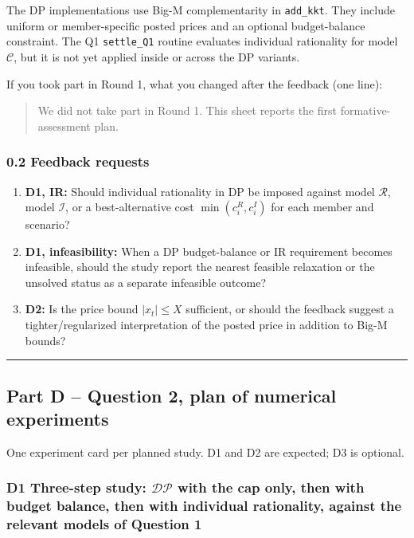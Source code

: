 \documentclass[]{article}
\providecommand{\tightlist}{\setlength{\itemsep}{0pt}\setlength{\parskip}{0pt}}
\begin{document}
The DP implementations use Big-M complementarity in \texttt{add\_kkt}.
They include uniform or member-specific posted prices and an optional
budget-balance constraint. The Q1 \texttt{settle\_Q1} routine evaluates
individual rationality for model \(\mathcal C\), but it is not yet applied
inside or across the DP variants.

If you took part in Round 1, what you changed after the feedback (one line):

\begin{quote}
We did not take part in Round 1. This sheet reports the first formative-assessment plan.
\end{quote}

\subsubsection{0.2 Feedback requests}
\label{feedback-requests}

\begin{enumerate}
\tightlist
\item
  \textbf{D1, IR:} Should individual rationality in DP be imposed against
  model \(\mathcal R\), model \(\mathcal I\), or a best-alternative cost
  \(\min(c_i^R,c_i^I)\) for each member and scenario?
\item
  \textbf{D1, infeasibility:} When a DP budget-balance or IR requirement
  becomes infeasible, should the study report the nearest feasible
  relaxation or the unsolved status as a separate infeasible outcome?
\item
  \textbf{D2:} Is the price bound \(|x_t|\le X\) sufficient, or should
  the feedback suggest a tighter/regularized interpretation of the posted
  price in addition to Big-M bounds?
\end{enumerate}

\begin{center}\rule{0.5\linewidth}{0.5pt}\end{center}

\subsection{Part D -- Question 2, plan of numerical experiments}
\label{part-d-question-2-plan-of-numerical-experiments}

One experiment card per planned study. D1 and D2 are expected; D3 is
optional.

\subsubsection{D1 Three-step study: \(\mathcal{DP}\) with the cap only,
then with budget balance, then with individual rationality, against the
relevant models of Question 1}
\label{d1-three-step-study-mathcaldp}
\end{document}
